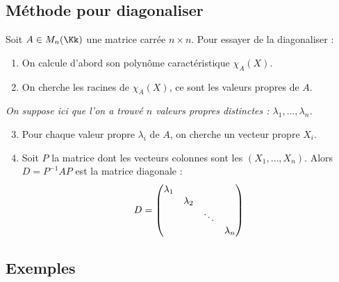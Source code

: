 \documentclass[11pt, class=report,crop=false]{standalone}
\begin{document}
\subsection{Méthode pour diagonaliser}


Soit $A \in M_n(\Kk)$ une matrice carrée $n \times n$. 
Pour essayer de la diagonaliser :
\begin{enumerate}
  \item On calcule d'abord son polynôme caractéristique $\chi_A(X)$.
  \item On cherche les racines de $\chi_A(X)$, ce sont les valeurs propres de $A$.
\end{enumerate} 


\emph{On suppose ici que l'on a trouvé $n$ valeurs propres distinctes : $\lambda_1,\ldots,\lambda_n$.}

\begin{enumerate}  
  \setcounter{enumi}{2}
  \item Pour chaque valeur propre $\lambda_i$ de $A$, on cherche un vecteur propre $X_i$.
  
  \item Soit $P$ la matrice dont les vecteurs colonnes sont les $(X_1,\ldots,X_n)$.
  Alors $D=P^{-1}AP$ est la matrice diagonale :
  $$D = \begin{pmatrix}
\lambda_{1}&&& \cr
&\lambda_{2}&&\cr
&& \ddots &\cr
&&& \lambda_{n}
\end{pmatrix}$$
 
 
 \end{enumerate} 
 

\subsection{Exemples}
\end{document}
